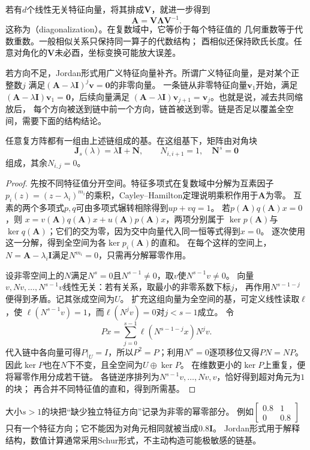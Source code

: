 若有$d$个线性无关特征向量，将其排成$\bm V$，就进一步得到
\[
 \bm A=\bm V\bm\Lambda\bm V^{-1}.
\]
这称为（diagonalization）。在复数域中，它等价于每个特征值的
几何重数等于代数重数。一般相似关系只保持同一算子的代数结构；
酉相似还保持欧氏长度。任意对角化的$\bm V$未必酉，坐标变换可能放大误差。

若方向不足，Jordan形式用广义特征向量补齐。所谓广义特征向量，是对某个正整数$j$
满足$(\bm A-\lambda\bm I)^j\bm v=\bm0$的非零向量。
一条链从非零特征向量$\bm v_1$开始，满足
$(\bm A-\lambda\bm I)\bm v_1=\bm0$，后续向量满足
$(\bm A-\lambda\bm I)\bm v_{j+1}=\bm v_j$。也就是说，减去共同缩放后，
每个方向被送到链中前一个方向，链首被送到零。链是否足以覆盖全空间，需要下面的结构结论。
\begin{theorem}[复矩阵的Jordan链分解]
任意复方阵都有一组由上述链组成的基。在这组基下，矩阵由对角块
\[
 \bm J_s(\lambda)=\lambda\bm I+\bm N,\qquad
 N_{i,i+1}=1,\quad \bm N^s=\bm0
\]
组成，其余$N_{i,j}=0$。
\end{theorem}
\begin{proof}
先按不同特征值分开空间。特征多项式在复数域中分解为互素因子
$p_i(z)=(z-\lambda_i)^{m_i}$的乘积，Cayley--Hamilton定理说明乘积作用于$\bm A$为零。
互素的两个多项式$p,q$可由多项式辗转相除得到$up+vq=1$。
若$p(\bm A)q(\bm A)x=0$，则
$x=v(\bm A)q(\bm A)x+u(\bm A)p(\bm A)x$，两项分别属于
$\ker p(\bm A)$与$\ker q(\bm A)$；它们的交为零，因为交中向量代入同一恒等式得到$x=0$。
逐次使用这一分解，得到全空间为各$\ker p_i(\bm A)$的直和。
在每个这样的空间上，$N=\bm A-\lambda_i\bm I$满足$N^{m_i}=0$，只需再分解幂零作用。

设非零空间上的$N$满足$N^s=0$且$N^{s-1}\neq0$，取$v$使$N^{s-1}v\neq0$。
向量$v,Nv,\ldots,N^{s-1}v$线性无关：若有关系，取最小的非零系数下标$j$，
再作用$N^{s-1-j}$便得到矛盾。记其张成空间为$U$。
扩充这组向量为全空间的基，可定义线性读取$\ell$，使
$\ell(N^{s-1}v)=1$，而$\ell(N^jv)=0$对$j<s-1$成立。
令
\[
 P x=\sum_{j=0}^{s-1}\ell(N^{s-1-j}x)N^jv.
\]
代入链中各向量可得$P|_U=I$，所以$P^2=P$；利用$N^s=0$逐项移位又得$PN=NP$。
因此$\ker P$也在$N$下不变，且全空间为$U\oplus\ker P$。
在维数更小的$\ker P$上重复，便将幂零作用分成若干链。
各链逆序排列为$N^{s-1}v,\ldots,Nv,v$，恰好得到超对角元为$1$的块；
再合并不同特征值的直和，得到所需基。
\end{proof}
大小$s>1$的块把“缺少独立特征方向”记录为非零的幂零部分。
例如$\left[\begin{smallmatrix}0.8&1\\0&0.8\end{smallmatrix}\right]$
只有一个特征方向；它不能因为对角元相同就被当成$0.8\bm I$。
Jordan形式用于解释结构，数值计算通常采用Schur形式，不主动构造可能极敏感的链基。


